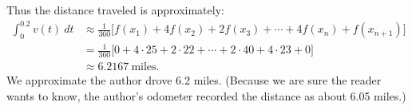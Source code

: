 \begin{solution}
{Thus the distance traveled is approximately:
\begin{align*}
\int_0^{0.2}v(t)\ dt &\approx \frac{1}{360}\Big[f(x_1)+4f(x_2) + 2f(x_3) + \cdots + 4f(x_n)+f(x_{n+1})\Big]\\
					&= \frac{1}{360}\Big[0+4\cdot25+2\cdot 22 + \cdots + 2\cdot40+4\cdot 23 + 0\Big]\\
					&\approx 6.2167 \ \text{miles.}
\end{align*}
We approximate the author drove 6.2 miles. (Because we are sure the reader wants to know, the author's odometer recorded the distance as about 6.05 miles.)
}\\
\end{solution}





%
%

















